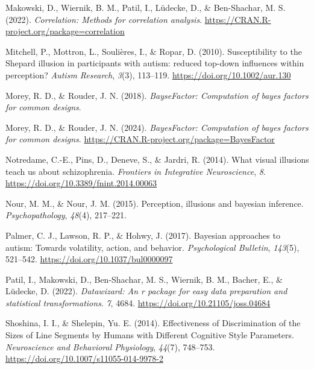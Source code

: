 \documentclass[
  man,
  floatsintext,
  longtable,
  nolmodern,
  notxfonts,
  notimes,
  colorlinks=true,linkcolor=blue,citecolor=blue,urlcolor=blue]{apa7}
\newlength{\cslhangindent}
\newenvironment{CSLReferences}[2] %
 {\begin{list}{}{%
  \setlength{\itemindent}{0pt}
  \setlength{\leftmargin}{0pt}
  \setlength{\parsep}{0pt}
  \ifodd #1
   \setlength{\leftmargin}{\cslhangindent}
   \setlength{\itemindent}{-1\cslhangindent}
  \fi
  \setlength{\itemsep}{#2\baselineskip}}}
 {\end{list}}
\begin{document}
\begin{CSLReferences}{1}{0}
Makowski, D., Wiernik, B. M., Patil, I., Lüdecke, D., \& Ben-Shachar, M.
S. (2022).
\emph{{\textbraceleft}{\textbraceleft}Correlation{\textbraceright}{\textbraceright}:
Methods for correlation analysis}.
\url{https://CRAN.R-project.org/package=correlation}

Mitchell, P., Mottron, L., Soulières, I., \& Ropar, D. (2010).
Susceptibility to the Shepard illusion in participants with autism:
reduced top{-}down influences within perception? \emph{Autism Research},
\emph{3}(3), 113--119. \url{https://doi.org/10.1002/aur.130}

Morey, R. D., \& Rouder, J. N. (2018). \emph{BayseFactor: Computation of
bayes factors for common designs}.

Morey, R. D., \& Rouder, J. N. (2024). \emph{BayesFactor: Computation of
bayes factors for common designs}.
\url{https://CRAN.R-project.org/package=BayesFactor}

Notredame, C.-E., Pins, D., Deneve, S., \& Jardri, R. (2014). What
visual illusions teach us about schizophrenia. \emph{Frontiers in
Integrative Neuroscience}, \emph{8}.
\url{https://doi.org/10.3389/fnint.2014.00063}

Nour, M. M., \& Nour, J. M. (2015). Perception, illusions and bayesian
inference. \emph{Psychopathology}, \emph{48}(4), 217--221.

Palmer, C. J., Lawson, R. P., \& Hohwy, J. (2017). Bayesian approaches
to autism: Towards volatility, action, and behavior. \emph{Psychological
Bulletin}, \emph{143}(5), 521--542.
\url{https://doi.org/10.1037/bul0000097}

Patil, I., Makowski, D., Ben-Shachar, M. S., Wiernik, B. M., Bacher, E.,
\& Lüdecke, D. (2022).
\emph{{\textbraceleft}Datawizard{\textbraceright}: An
{\textbraceleft}r{\textbraceright} package for easy data preparation and
statistical transformations}. \emph{7}, 4684.
\url{https://doi.org/10.21105/joss.04684}

Shoshina, I. I., \& Shelepin, Yu. E. (2014). Effectiveness of
Discrimination of the Sizes of Line Segments by Humans with Different
Cognitive Style Parameters. \emph{Neuroscience and Behavioral
Physiology}, \emph{44}(7), 748--753.
\url{https://doi.org/10.1007/s11055-014-9978-2}


\end{CSLReferences}
\end{document}
